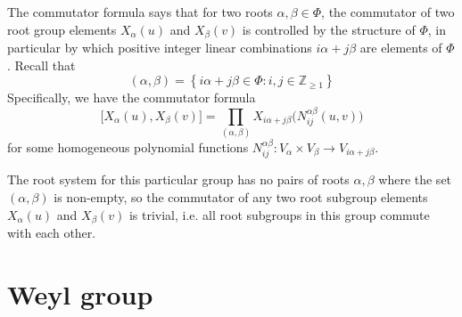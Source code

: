 \documentclass[11pt]{article}
\newcommand{\noi}{\noindent}
\newcommand{\tbf}{\textbf}
\newcommand{\lb}{\left\{}
\newcommand{\rb}{\right\}}
\newcommand{\Z}{\mathbb{Z}}
\theoremstyle{definition}
\newif\ifsummablepairs
\begin{document}
The commutator formula says that for two roots $\alpha, \beta \in \Phi$, the commutator of two root group elements $X_\alpha(u)$ and $X_\beta(v)$ is controlled by the structure of $\Phi$, in particular by which positive integer linear combinations $i\alpha + j\beta$ are elements of $\Phi$. Recall that
\[
	(\alpha, \beta) = \lb i \alpha + j\beta \in \Phi : i, j \in \Z_{\ge 1} \rb
\]
Specifically, we have the commutator formula
\[
	\Big[ X_\alpha(u), X_\beta(v) \Big] = \prod_{(\alpha, \beta)} X_{i\alpha + j\beta} \Big( N_{ij}^{\alpha \beta}(u,v) \Big)
\]
for some homogeneous polynomial functions $N_{ij}^{\alpha \beta}:V_{\alpha} \times V_{\beta} \to V_{i\alpha+j\beta}$. 
\ifsummablepairs
We repeat here the table of linear combinations of roots. The quantity $N_{ij}^{\alpha \beta}(u,v)$ is called a \tbf{commutator coefficient}. The table below gives these coefficients.

\bigskip

\def\arraystretch{1.2}
\noi 
\def\arraystretch{1}

\subsection{Commutator identities}

CommutatorEquationsPlaceholder

\else
The root system for this particular group has no pairs of roots $\alpha, \beta$ where the set $(\alpha, \beta)$ is non-empty, so the commutator of any two root subgroup elements $X_\alpha(u)$ and $X_\beta(v)$ is trivial, i.e. all root subgroups in this group commute with each other.
\fi

\newpage
\section{Weyl group}
\end{document}
